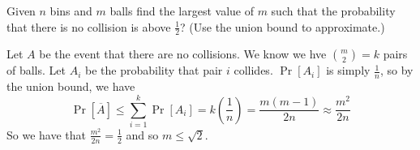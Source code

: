 \question 
Given $n$ bins and $m$ balls find the largest value of $m$ such that the probability that there is no collision is above $\frac{1}{2}$? (Use the union bound to approximate.)
    \begin{solution}[1.5 in] Let $A$ be the event that there are no collisions. We know we hve $\binom{m}{2} = k$ pairs of balls. Let $A_i$ be the probability that pair $i$ collides. $\Pr[A_i]$ is simply $\frac{1}{n}$, so by the union bound, we have 
    \[\Pr[\overline{A}] \leq \sum_{i=1}^{k} \Pr[A_i] = k \left(\frac{1}{n}\right) = \frac{m(m-1)}{2n}\approx \frac{m^2}{2n}\]
    So we have that $\frac{m^2}{2n} = \frac{1}{2}$ and so $m \leq \sqrt{2}$. 
\end{solution} 